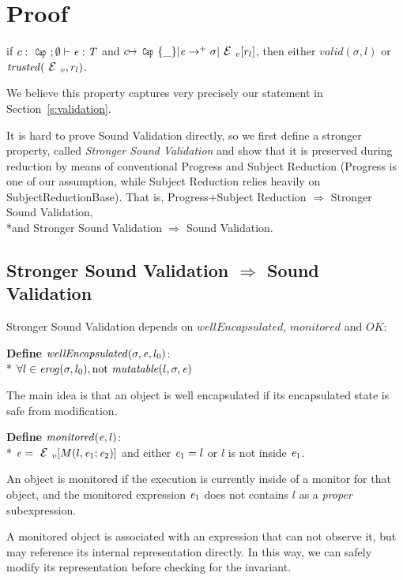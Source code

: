 \appendix
\section{Proof} 
\label{s:proof}

\begin{theorem}
	if $c:\Kw{Cap};\emptyset\vdash \e: \T$ and
	$c\mapsto\Kw{Cap}\{\_\}|\e\rightarrow^+ \sigma|\ctx_v[r_l]$, then
	either $valid(\sigma,l)$ or $\mathit{trusted}(\ctx_v,r_l)$.
\end{theorem}

We believe this property captures very precisely our statement in Section~\ref{s:validation}.

It is hard to prove Sound Validation directly,
so we first define a stronger property,
called \emph{Stronger Sound Validation} and
show that it is preserved during reduction by means of conventional 
Progress and Subject Reduction (Progress is one of our assumption,
while Subject Reduction relies heavily on SubjectReductionBase).
That is,
Progress+Subject Reduction $\Rightarrow$ Stronger Sound Validation,
\\*and Stronger Sound Validation $\Rightarrow$ Sound Validation.

\subsection{Stronger Sound Validation $\Rightarrow$ Sound Validation}

Stronger Sound Validation depends on 
$\mathit{wellEncapsulated}$, $\mathit{monitored}$
and $OK$:

\noindent\textbf{Define} $\mathit{wellEncapsulated}(\sigma,\e,l_0)$:\\*
\indent$\forall l \in \mathit{erog}(\sigma,l_0), \text{not}\ \mathit{mutatable}(l,\sigma,\e)$

\noindent The main idea is that an object is well encapsulated if its encapsulated state is safe from
modification. 

\noindent\textbf{Define} $\mathit{monitored}({\mathit{e}},l)$:\\*
\indent$\e=\ctx_v[M(l,\e_1;\e_2)]$ and either ${\mathit{e}}_1=l$ or $l$ is not inside ${\mathit{e}}_1$.

\noindent An object is monitored if the execution
is currently inside of a monitor for that object, and
the monitored expression ${\mathit{e}}_1$ does not
contains $l$ as a \emph{proper} subexpression.

A monitored object is associated with an expression that can not observe it, but may 
reference its internal representation directly.
In this way, we can safely modify its representation before checking for the invariant.

